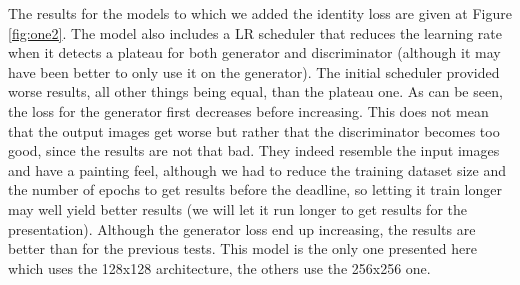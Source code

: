 \documentclass[twocolumn,superscriptaddress,aps,floatfix,nofootinbib]{revtex4-1}
\begin{document}
    The results for the models to which we added the identity loss are given at Figure \ref{fig:one2}. The model also includes a LR scheduler that reduces the learning rate when it detects a plateau for both generator and discriminator (although it may have been better to only use it on the generator). The initial scheduler provided worse results, all other things being equal, than the plateau one. As can be seen, the loss for the generator first decreases before increasing. This does not mean that the output images get worse but rather that the discriminator becomes too good, since the results are not that bad. They indeed resemble the input images and have a painting feel, although we had to reduce the training dataset size and the number of epochs to get results before the deadline, so letting it train longer may well yield better results (we will let it run longer to get results for the presentation). Although the generator loss end up increasing, the results are better than for the previous tests. This model is the only one presented here which uses the 128x128 architecture, the others use the 256x256 one.
    
\end{document}
